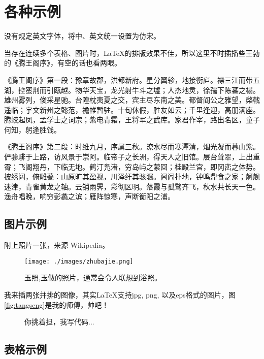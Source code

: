 \section{各种示例}

没有规定英文字体，将中、英文统一设置为仿宋。

当存在连续多个表格、图片时，\LaTeX 的排版效果不佳，所以这里不时插播些王勃的《腾王阁序》，有空的话也看两眼。

《腾王阁序》第一段：豫章故郡，洪都新府。星分翼轸，地接衡庐。襟三江而带五湖，控蛮荆而引瓯越。物华天宝，龙光射牛斗之墟；人杰地灵，徐孺下陈蕃之榻。雄州雾列，俊采星驰。台隍枕夷夏之交，宾主尽东南之美。都督阎公之雅望，棨戟遥临；宇文新州之懿范，襜帷暂驻。十旬休假，胜友如云；千里逢迎，高朋满座。腾蛟起凤，孟学士之词宗；紫电青霜，王将军之武库。家君作宰，路出名区，童子何知，躬逢胜饯。

《腾王阁序》第二段：时维九月，序属三秋。潦水尽而寒潭清，烟光凝而暮山紫。俨骖騑于上路，访风景于崇阿。临帝子之长洲，得天人之旧馆。层台耸翠，上出重霄；飞阁翔丹，下临无地。鹤汀凫渚，穷岛屿之萦回；桂殿兰宫，即冈峦之体势。披绣闼，俯雕甍：山原旷其盈视，川泽纡其骇瞩。闾阎扑地，钟鸣鼎食之家；舸舰迷津，青雀黄龙之轴。云销雨霁，彩彻区明。落霞与孤鹜齐飞，秋水共长天一色。渔舟唱晚，响穷彭蠡之滨；雁阵惊寒，声断衡阳之浦。

\subsection{图片示例}

附上照片一张，来源 Wikipedia。

\begin{figure}[htbp]
  \centering
  \texttt{[image: ./images/zhubajie.png]}
  \caption{玉照,玉做的照片，通常会令人联想到浴照。}
  \label{fig:example}
\end{figure}

我来插两张并排的图像，其实\LaTeX 支持jpg, png, 以及eps格式的图片，图\ref{fig:tangseng}是我的师傅，帅吧！

\begin{figure}[htbp]
\centering
{}
\hspace{60pt}
\caption{你挑着担，我写代码...}
\end{figure}

\subsection{表格示例}

